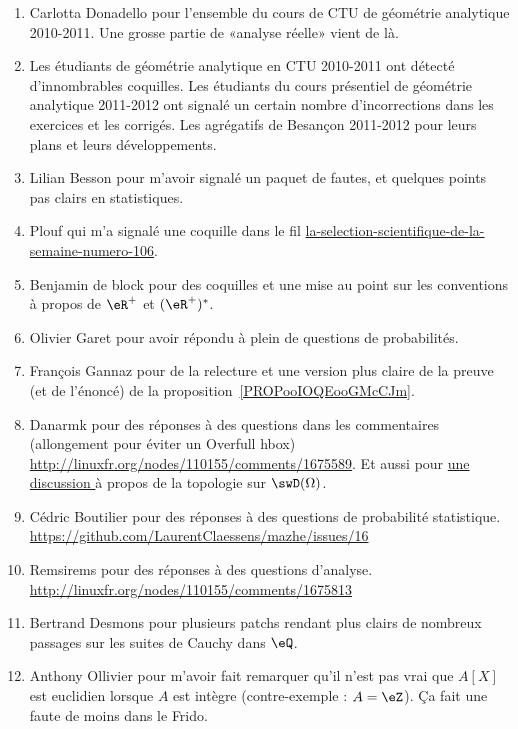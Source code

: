 \begin{enumerate}
    \item
        Carlotta Donadello pour l'ensemble du cours de CTU de géométrie analytique 2010-2011. Une grosse partie de «analyse réelle» vient de là.
    \item
        Les étudiants de géométrie analytique en CTU 2010-2011 ont détecté d'innombrables coquilles. Les étudiants du cours présentiel de géométrie analytique 2011-2012 ont signalé un certain nombre d'incorrections dans les exercices et les corrigés. Les agrégatifs de Besançon 2011-2012 pour leurs plans et leurs développements.
    \item
        Lilian Besson pour m'avoir signalé un paquet de fautes, et quelques points pas clairs en statistiques.
    \item
        Plouf qui m'a signalé une coquille dans le fil \href{http://passeurdesciences.blog.lemonde.fr/2014/01/24/la-selection-scientifique-de-la-semaine-numero-106}{la-selection-scientifique-de-la-semaine-numero-106}.
    \item
        Benjamin de block pour des coquilles et une mise au point sur les conventions à propos de \( \eR^+\) et \( (\eR^+)^*\).
    \item
        Olivier Garet pour avoir répondu à plein de questions de probabilités.
    \item
        François Gannaz pour de la relecture et une version plus claire de la preuve (et de l'énoncé) de la proposition~\ref{PROPooIOQEooGMcCJm}.
    \item
        Danarmk pour des réponses à des questions dans les commentaires (allongement pour éviter un Overfull hbox) \url{http://linuxfr.org/nodes/110155/comments/1675589}. Et aussi pour \href{ https://github.com/LaurentClaessens/mazhe/issues/87 }{ une discussion } à propos de la topologie sur \( \swD(\Omega)\).
    \item
        Cédric Boutilier pour des réponses à des questions de probabilité statistique. \url{https://github.com/LaurentClaessens/mazhe/issues/16}
    \item
        Remsirems pour des réponses à des questions d'analyse. \url{http://linuxfr.org/nodes/110155/comments/1675813}
    \item
        Bertrand Desmons pour plusieurs patchs rendant plus clairs de nombreux passages sur les suites de Cauchy dans \( \eQ\).
    \item
        Anthony Ollivier pour m'avoir fait remarquer qu'il n'est pas vrai que \( A[X]\) est euclidien lorsque \( A\) est intègre (contre-exemple : \( A=\eZ\)). Ça fait une faute de moins dans le Frido.

\end{enumerate}
